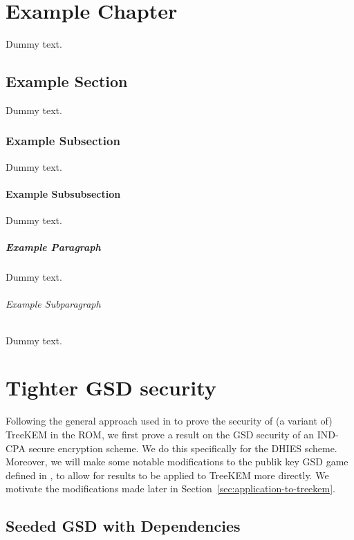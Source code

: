 \chapter{Example Chapter}

Dummy text.

\section{Example Section}

Dummy text.

\subsection{Example Subsection}

Dummy text.

\subsubsection{Example Subsubsection}

Dummy text.

\paragraph{Example Paragraph}

Dummy text.

\subparagraph{Example Subparagraph}

Dummy text.

\chapter{Tighter GSD security}


Following the general approach used in \cite{ttkem} to prove the security of (a variant of) TreeKEM in the ROM, we first prove a result on the GSD security of an IND-CPA secure encryption scheme. We do this specifically for the DHIES scheme. Moreover, we will make some notable modifications to the publik key GSD game defined in \cite{ttkem}, to allow for results to be applied to TreeKEM more directly. We motivate the modifications made later in Section~\vref{sec:application-to-treekem}.

\section{Seeded GSD with Dependencies}

